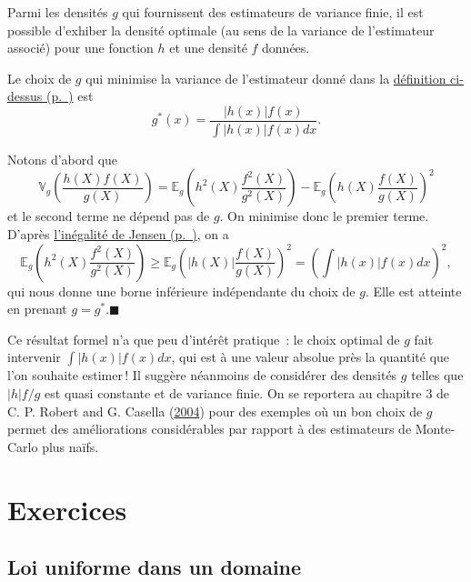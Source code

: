 Parmi les densités \(g\) qui fournissent des estimateurs de variance
finie, il est possible d'exhiber la densité optimale (au sens de la
variance de l'estimateur associé) pour une fonction \(h\) et une densité
\(f\) données.

\begin{theoreme}\label{V-densituxe9-optimale}

Le choix de \(g\) qui minimise la variance de l'estimateur donné dans la
\protect\hyperref[V-is]{définition ci-dessus (p.~\pageref*{V-is})} est
\[g^\ast(x) = \frac{|h(x)|f(x)}{\int |h(x)|f(x) dx}.\]
\end{theoreme}

\begin{preuve}
Notons d'abord que
\[\mathbb{V}_g\left(\frac{h(X)f(X)}{g(X)}\right) = \mathbb{E}_g\left(h^2(X)\frac{f^2(X)}{g^2(X)}\right) - \mathbb{E}_g\left(h(X)\frac{f(X)}{g(X)}\right)^2\]
et le second terme ne dépend pas de \(g\). On minimise donc le premier
terme. D'après \protect\hyperref[II-jensen]{l'inégalité de
Jensen (p.~\pageref*{II-jensen})}, on a
\[\mathbb{E}_g\left(h^2(X)\frac{f^2(X)}{g^2(X)}\right) \geq \mathbb{E}_g\left(|h(X)|\frac{f(X)}{g(X)}\right)^2 = \left(\int|h(x)|f(x)dx\right)^2,\]
qui nous donne une borne inférieure indépendante du choix de \(g\). Elle
est atteinte en prenant \(g=g^\ast\).\hfill$\blacksquare$
\end{preuve}

Ce résultat formel n'a que peu d'intérêt pratique~: le choix optimal de
\(g\) fait intervenir \(\int|h(x)|f(x)dx\), qui est à une valeur absolue
près la quantité que l'on souhaite estimer\,! Il suggère néanmoins de
considérer des densités \(g\) telles que \(|h|f/g\) est quasi constante
et de variance finie. On se reportera au chapitre 3 de C. P. Robert and
G. Casella (\protect\hyperlink{refV-roca}{2004}) pour des exemples où un
bon choix de \(g\) permet des améliorations considérables par rapport à
des estimateurs de Monte-Carlo plus naïfs.

\chapter{Exercices}\label{V-exercices}

\section{Loi uniforme dans un
domaine}\label{V-loi-uniforme-dans-un-domaine}

